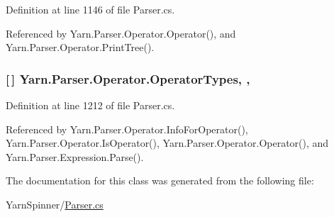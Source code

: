 Definition at line 1146 of file Parser.\-cs.



Referenced by Yarn.\-Parser.\-Operator.\-Operator(), and Yarn.\-Parser.\-Operator.\-Print\-Tree().

\hypertarget{a00143_ad8a4bb1b46dbc3d1b7708e78a2d97e1c}{
\subsubsection[{Operator\-Types}]{ \mbox{[}$\,$\mbox{]} Yarn.\-Parser.\-Operator.\-Operator\-Types\hspace{0.3cm}{\ttfamily [static]}, {\ttfamily [get]}, {\ttfamily [package]}}}\label{a00143_ad8a4bb1b46dbc3d1b7708e78a2d97e1c}


Definition at line 1212 of file Parser.\-cs.



Referenced by Yarn.\-Parser.\-Operator.\-Info\-For\-Operator(), Yarn.\-Parser.\-Operator.\-Is\-Operator(), Yarn.\-Parser.\-Operator.\-Operator(), and Yarn.\-Parser.\-Expression.\-Parse().



The documentation for this class was generated from the following file\-:\begin{DoxyCompactItemize}
\item 
Yarn\-Spinner/\hyperlink{a00313}{Parser.\-cs}\end{DoxyCompactItemize}
